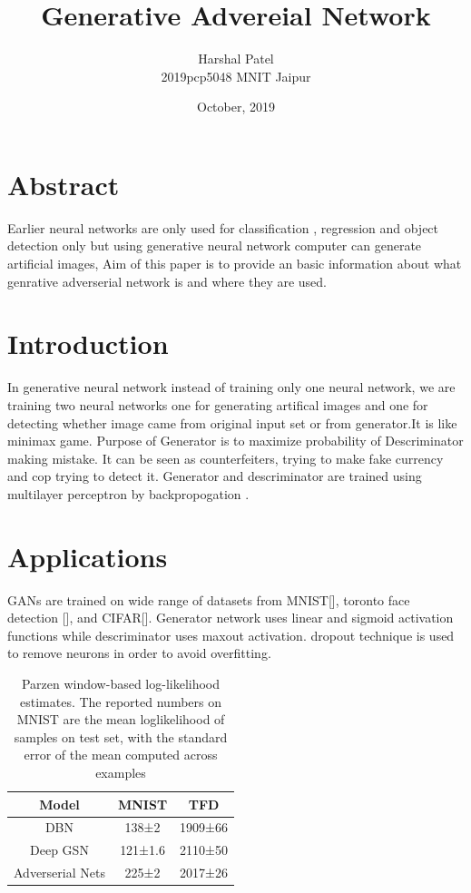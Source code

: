\documentclass[12pt]{article}
\title{Generative Advereial Network}
\author{Harshal Patel\\2019pcp5048 MNIT Jaipur}
\date{October, 2019}
\begin{document}
\maketitle
\section*{Abstract}
Earlier neural networks are only used for classification , regression and object detection only but using generative neural network computer can generate artificial images, Aim of this paper is to provide an basic information about what genrative adverserial network is and where they are used.

\begin{multicols}{2}
\section{Introduction}
In generative neural network instead of training only one neural network, we are training two neural networks one for generating artifical images and one for detecting whether image came from original input set or from generator.It is like minimax game. Purpose of Generator is to maximize probability of Descriminator making mistake.
It can be seen as counterfeiters, trying to make fake currency and cop trying to detect it.
Generator and descriminator are trained using multilayer perceptron by backpropogation .

\section{Applications}
GANs are trained on wide range of datasets from MNIST[], toronto face detection [], and CIFAR[].
Generator network uses linear and sigmoid activation functions while descriminator uses maxout activation. dropout technique is used to remove neurons in order to avoid overfitting. 


\end{multicols}
\begin{table}
\begin{tabular}{ c | c | c } 
 \hline
\textbf{Model} & \textbf{MNIST} & \textbf{TFD}\\
 \hline\hline
 DBN & 138±2 & 1909±66\\

Deep GSN & 121±1.6 & 2110±50\\
Adverserial Nets & 225±2 & 2017±26


\end{tabular}
\caption{Parzen window-based log-likelihood estimates. The reported numbers on MNIST are the mean loglikelihood of samples on test set, with the standard error of the mean computed across examples}
\end{table}
\end{document}
